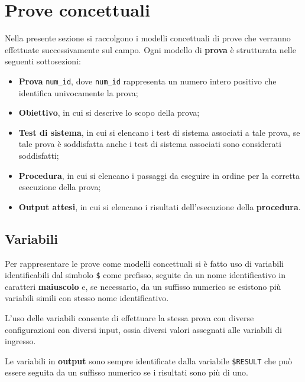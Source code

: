 \documentclass[../SperimentazioniPratiche.tex]{subfiles}
\begin{document}
	
\section{Prove concettuali}
	Nella presente sezione si raccolgono i modelli concettuali di prove che verranno effettuate successivamente sul campo. Ogni modello di \textbf{prova} è strutturata nelle seguenti sottosezioni:
	\begin{itemize}
		\item \textbf{Prova} \verb|num_id|, dove \verb|num_id| rappresenta un numero intero positivo che identifica univocamente la prova;
		\item \textbf{Obiettivo}, in cui si descrive lo scopo della prova;
		\item \textbf{Test di sistema}, in cui si elencano i test di sistema associati a tale prova, se tale prova è soddisfatta anche i test di sistema associati sono considerati soddisfatti;
		\item \textbf{Procedura}, in cui si elencano i passaggi da eseguire in ordine per la corretta esecuzione della prova;
		\item \textbf{Output attesi}, in cui si elencano i risultati dell'esecuzione della \textbf{procedura}.
	\end{itemize}
	
\subsection{Variabili}
	Per rappresentare le prove come modelli concettuali si è fatto uso di variabili identificabili dal simbolo \verb|$| come prefisso, seguite da un nome identificativo in caratteri \textbf{maiuscolo} e, se necessario, da un suffisso numerico se esistono più variabili simili con stesso nome identificativo.

	L'uso delle variabili consente di effettuare la stessa prova con diverse configurazioni con diversi input, ossia diversi valori assegnati alle variabili di ingresso.
	
	Le variabili in \textbf{output} sono sempre identificate dalla variabile \verb|$RESULT| che può essere seguita da un suffisso numerico se i risultati sono più di uno.
	
\end{document}

